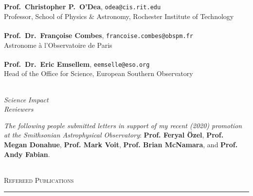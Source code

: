 \documentclass[11pt]{article}
\makeatletter
\def\vhrulefill#1{\leavevmode\leaders\hrule\@height#1\hfill \kern\z@}
\makeatother
\begin{document}
{\textbf{Prof.~Christopher P.~O'Dea}, \texttt{odea@cis.rit.edu}\\
Professor, School of Physics \& Astronomy, Rochester Institute of Technology\\ \\
\textbf{Prof.~Dr.~Fran\c coise Combes}, \texttt{francoise.combes@obspm.fr}\\
Astronome \`a l'Observatoire de Paris\\ \\
\textbf{Prof.~Dr.~Eric Emsellem}, \texttt{eemselle@eso.org}\\
Head of the Office for Science, European Southern Observatory\\ \\
}





\hspace{2.5mm} \parbox{1.5in}{\textit{Science Impact \\ Reviewers\\}} \parbox{5.15in}{\textit{The following people submitted letters in support of my recent (2020) promotion at the Smithsonian Astrophysical Observatory}: \textbf{Prof. Feryal \"{O}zel}, \textbf{Prof. Megan Donahue}, \textbf{Prof. Mark Voit}, \textbf{Prof. Brian McNamara}, and \textbf{Prof. Andy Fabian}.}\\





\textsc{Refereed Publications} \vhrulefill{0.4pt}\\
\end{document}
